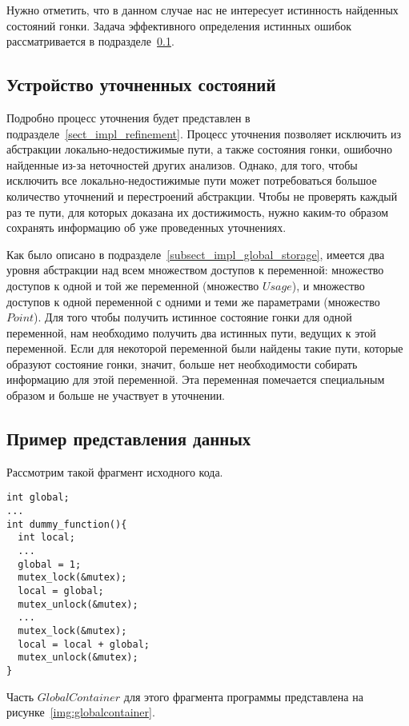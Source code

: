 Нужно отметить, что в данном случае нас не интересует истинность найденных состояний гонки.
Задача эффективного определения истинных ошибок рассматривается в подразделе~\ref{subsect_impl_refined_usages}.

\subsection{Устройство уточненных состояний} \label{subsect_impl_refined_usages}

Подробно процесс уточнения будет представлен в подразделе~\ref{sect_impl_refinement}.
Процесс уточнения позволяет исключить из абстракции локально-недостижимые пути, а также состояния гонки, ошибочно найденные из-за неточностей других анализов.
Однако, для того, чтобы исключить все локально-недостижимые пути может потребоваться большое количество уточнений и перестроений абстракции.
Чтобы не проверять каждый раз те пути, для которых доказана их достижимость, нужно каким-то образом сохранять информацию об уже проведенных уточнениях.

Как было описано в подразделе~\ref{subsect_impl_global_storage}, имеется два уровня абстракции над всем множеством доступов к переменной:
множество доступов к одной и той же переменной (множество $Usage$), и множество доступов к одной переменной с одними и теми же параметрами (множество $Point$).
Для того чтобы получить истинное состояние гонки для одной переменной, нам необходимо получить два истинных пути, ведущих к этой переменной. 
Если для некоторой переменной были найдены такие пути, которые образуют состояние гонки, значит, больше нет необходимости собирать информацию для этой переменной. Эта переменная помечается специальным образом и больше не участвует в уточнении.

\subsection{Пример представления данных} \label{subsect_impl_example}

Рассмотрим такой фрагмент исходного кода.

\begin{verbatim}
int global;
...
int dummy_function(){
  int local;
  ...
  global = 1;
  mutex_lock(&mutex);
  local = global;
  mutex_unlock(&mutex);
  ...
  mutex_lock(&mutex);
  local = local + global;
  mutex_unlock(&mutex);
}
\end{verbatim}

Часть $GlobalContainer$ для этого фрагмента программы представлена на рисунке~\ref{img:globalcontainer}. 

